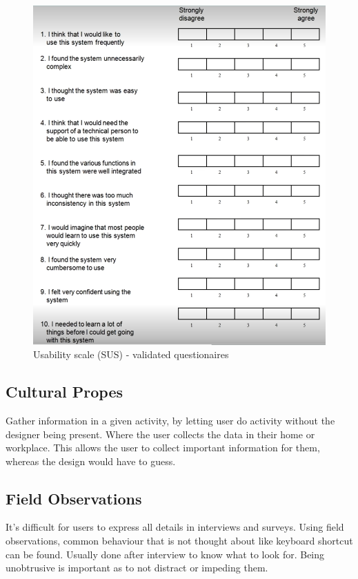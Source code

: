 \begin{figure}[H]
    \begin{center}
        \includegraphics*[width=\linewidth*3/4]{chapters/data_collection/figures/sus_scale.png}        
    \end{center}
    \caption{Usability scale (SUS) - validated questionaires}
    \label{fig:sus}
\end{figure}

\subsection*{Cultural Propes}
Gather information in a given activity, by letting user do activity without the designer being present. Where the user collects the data in their home or workplace. This allows the user to collect important information for them, whereas the design would have to guess.

\subsection*{Field Observations}
It's difficult for users to express all details in interviews and surveys. Using field observations, common behaviour that is not thought about like keyboard shortcut can be found. Usually done after interview to know what to look for. Being unobtrusive is important as to not distract or impeding them.